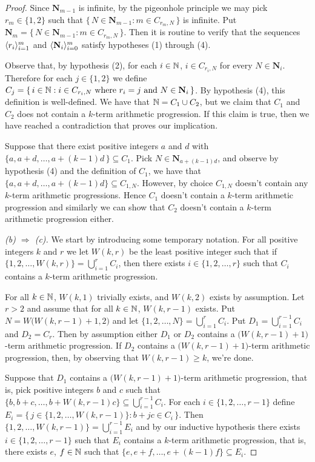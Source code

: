 \begin{proof}
  Since $\mathbf{N}_{m-1}$ is infinite, by the pigeonhole principle we may pick $r_m \in \{1, 2\}$ such that $\{\, N \in \mathbf{N}_{m-1} : m \in C_{r_m, N} \,\}$ is infinite. 
  Put $\mathbf{N}_m = \{\, N \in \mathbf{N}_{m-1} : m \in C_{r_m, N} \,\}$.
  Then it is routine to verify that the sequences $\langle r_i \rangle_{i=1}^m$ and $\langle \mathbf{N}_i \rangle_{i=0}^m$ satisfy hypotheses (1) through (4).

  Observe that, by hypothesis (2), for each $i \in \mathbb{N}$, $i \in C_{r_i, N}$ for every $N \in \mathbf{N}_i$.
  Therefore for each $j \in \{1, 2\}$ we define $C_j = \{\, i \in \mathbb{N} : \mbox{$i \in C_{r_i, N}$ where $r_i = j$ and $N \in \mathbf{N}_i$} \,\}$.
  By hypothesis (4), this definition is well-defined.
  We have that $\mathbb{N} = C_1 \cup C_2$, but we claim that $C_1$ and $C_2$ does not contain a $k$-term arithmetic progression. 
  If this claim is true, then we have reached a contradiction that proves our implication.

  Suppose that there exist positive integers $a$ and $d$ with $\{a, a+d, \ldots, a+(k-1)d \,\} \subseteq C_1$. 
  Pick $N \in \mathbf{N}_{a+(k-1)d}$, and observe by hypothesis (4) and the definition of $C_1$, we have that $\{a, a+d, \ldots, a+(k-1)d\} \subseteq C_{1,N}$. 
  However, by choice $C_{1,N}$ doesn't contain any $k$-term arithmetic progressions. 
  Hence $C_1$ doesn't contain a $k$-term arithmetic progression and similarly we can show that $C_2$ doesn't contain a $k$-term arithmetic progression either. 

  \textsl{(b) $\Rightarrow$ (c).}
  We start by introducing some temporary notation.
  For all positive integers $k$ and $r$ we let $W(k,r)$ be the least positive integer such that if $\{1, 2, \ldots, W(k,r)\} = \bigcup_{i=1}^r C_i$, then there exists $i \in \{1, 2, \ldots, r\}$ such that $C_i$ contains a $k$-term arithmetic progression.

  For all $k \in \mathbb{N}$, $W(k, 1)$ trivially exists, and $W(k, 2)$ exists by assumption.
  Let $r > 2$ and assume that for all $k \in \mathbb{N}$, $W(k, r-1)$ exists. 
  Put $N = W\bigl( W(k, r-1)+1, 2 \bigr)$ and let $\{1, 2, \ldots, N\} = \bigcup_{i=1}^r C_i$. 
  Put $D_1 = \bigcup_{i=1}^{r-1} C_i$ and $D_2 = C_r$.
  Then by assumption either $D_1$ or $D_2$ contains a $\bigl(W(k,r-1)+1\bigr)$-term arithmetic progression.
  If $D_2$ contains a $\bigl(W(k,r-1)+1\bigr)$-term arithmetic progression, then, by observing that $W(k,r-1) \ge k$, we're done. 

  Suppose that $D_1$ contains a $\bigl(W(k,r-1) + 1\bigr)$-term arithmetic progression, that is, pick positive integers $b$ and $c$ such that $\{b, b+c, \ldots, b+W(k,r-1)c\} \subseteq \bigcup_{i=1}^{r-1} C_i$. 
  For each $i \in \{1, 2, \ldots, r-1\}$ define $E_i = \bigl\{\, j \in \{1, 2, \ldots, W(k,r-1) \} : b+jc \in C_i \,\bigr\}$.
  Then $\{1, 2, \ldots, W(k, r-1)\} = \bigcup_{i=1}^{r-1} E_i$ and by our inductive hypothesis there exists $i \in \{1, 2, \ldots, r-1\}$ such that $E_i$ contains a $k$-term arithmetic progression, that is, there exists $e$, $f \in \mathbb{N}$ such that $\{e, e+f, \ldots, e+(k-1)f\} \subseteq E_i$. 


\end{proof}
